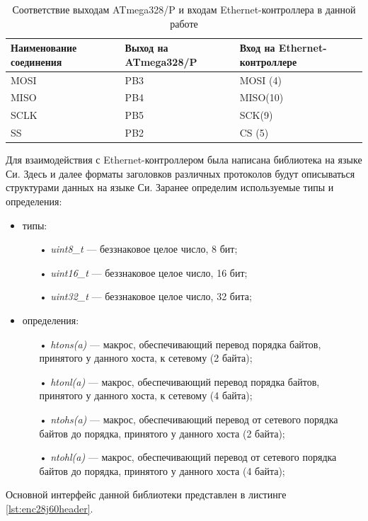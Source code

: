 \begin{table}[h!]
\caption{Соответствие выходам ATmega328/P и входам Ethernet-контроллера в данной работе}
\label{connection}
	\begin{tabular}{|p{40mm}|p{40mm}|p{40mm}|}
\hline
	Наименование соединения & Выход на ATmega328/P & Вход на Ethernet-контроллере \\
\hline
		MOSI & PB3 & MOSI (4)\\
\hline
		MISO & PB4 & MISO(10)\\
\hline
		SCLK & PB5 & SCK(9)\\
\hline
		SS & PB2 & CS (5)\\
\hline
\end{tabular}
\end{table}

Для взаимодействия с Ethernet-контроллером была написана библиотека на языке Си. Здесь и далее форматы заголовков различных протоколов будут описываться структурами данных на языке Си. Заранее определим используемые типы и определения:
\begin{itemize}
	\item типы:
	\begin{itemize}
		\item[•] \textit{uint8\_t} --- беззнаковое целое число, 8 бит;
		\item[•] \textit{uint16\_t} --- беззнаковое целое число, 16 бит;
		\item[•] \textit{uint32\_t} --- беззнаковое целое число, 32 бита;
	\end{itemize}
	\item определения:
	\begin{itemize}
		\item[•] \textit{htons(a)} --- макрос, обеспечивающий перевод порядка байтов, принятого у данного хоста, к сетевому (2 байта);
		\item[•] \textit{htonl(a)} --- макрос, обеспечивающий перевод порядка байтов, принятого у данного хоста, к сетевому (4 байта);
		\item[•] \textit{ntohs(a)} --- макрос, обеспечивающий перевод от сетевого порядка байтов до порядка, принятого у данного хоста (2 байта);
		\item[•] \textit{ntohl(a)} --- макрос, обеспечивающий перевод от сетевого порядка байтов до порядка, принятого у данного хоста (4 байта);
	\end{itemize}
\end{itemize}

Основной интерфейс данной библиотеки представлен в листинге \ref{lst:enc28j60header}. 


